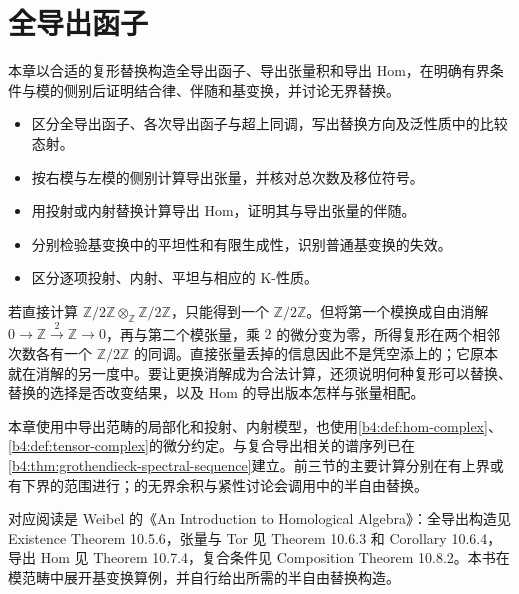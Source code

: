 
\chapter{全导出函子}
\label{b4:ch:18}

\begin{chapterabstract}
	本章以合适的复形替换构造全导出函子、导出张量积和导出 Hom，在明确有界条件与模的侧别后证明结合律、伴随和基变换，并讨论无界替换。
\end{chapterabstract}

\begin{learninggoals}
	\begin{itemize}
		\item 区分全导出函子、各次导出函子与超上同调，写出替换方向及泛性质中的比较态射。
		\item 按右模与左模的侧别计算导出张量，并核对总次数及移位符号。
		\item 用投射或内射替换计算导出 Hom，证明其与导出张量的伴随。
		\item 分别检验基变换中的平坦性和有限生成性，识别普通基变换的失效。
		\item 区分逐项投射、内射、平坦与相应的 K-性质。
	\end{itemize}
\end{learninggoals}

若直接计算 \(\mathbb Z/2\mathbb Z\otimes_{\mathbb Z}\mathbb Z/2\mathbb Z\)，只能得到一个 \(\mathbb Z/2\mathbb Z\)。但将第一个模换成自由消解 \(0\rightarrow\mathbb Z\xrightarrow{2}\mathbb Z\rightarrow0\)，再与第二个模张量，乘 \(2\) 的微分变为零，所得复形在两个相邻次数各有一个 \(\mathbb Z/2\mathbb Z\) 的同调。直接张量丢掉的信息因此不是凭空添上的；它原本就在消解的另一度中。要让更换消解成为合法计算，还须说明何种复形可以替换、替换的选择是否改变结果，以及 Hom 的导出版本怎样与张量相配。

\ProseParagraphBreak
本章使用中导出范畴的局部化和投射、内射模型，也使用\cref{b4:def:hom-complex}、\cref{b4:def:tensor-complex}的微分约定。与复合导出相关的谱序列已在\cref{b4:thm:grothendieck-spectral-sequence}建立。前三节的主要计算分别在有上界或有下界的范围进行；的无界余积与紧性讨论会调用中的半自由替换。

\ProseParagraphBreak
对应阅读是 Weibel 的《An Introduction to Homological Algebra》\cite[Sections 10.5--10.8]{Weibel1994HomologicalAlgebra}：全导出构造见 Existence Theorem 10.5.6，张量与 Tor 见 Theorem 10.6.3 和 Corollary 10.6.4，导出 Hom 见 Theorem 10.7.4，复合条件见 Composition Theorem 10.8.2。本书在模范畴中展开基变换算例，并自行给出所需的半自由替换构造。

